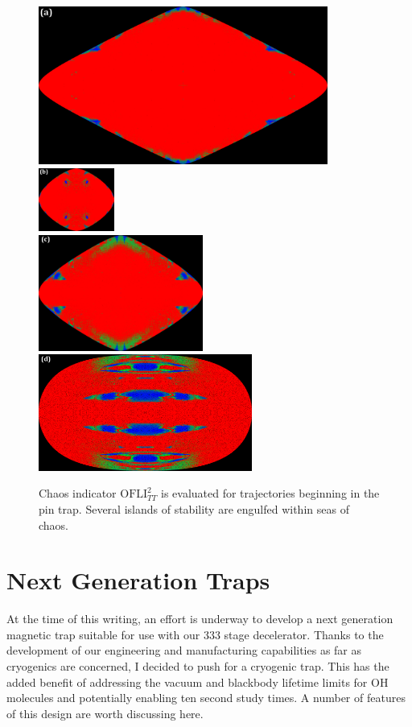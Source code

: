 \documentclass[defaultstyle,11pt]{thesis}
\begin{document}
\begin{figure}
\centering
\includegraphics[width=9.5cm]{pin0p25xy.png}
\includegraphics[width=2.5cm]{pin0p75xy.png}\\
\includegraphics[width=5.4cm]{pin0p5xy.png}
\includegraphics[width=7cm]{pin0p5yz.png}\\
\caption[Chaos Indicators in the Pin Trap]{Chaos indicator $\text{OFLI}_{TT}^2$ is evaluated for trajectories beginning in the pin trap. Several islands of stability are engulfed within seas of chaos.}
\label{pinchaos}
\end{figure}


\section{Next Generation Traps}

At the time of this writing, an effort is underway to develop a next generation magnetic trap suitable for use with our $333$ stage decelerator.
Thanks to the development of our engineering and manufacturing capabilities as far as cryogenics are concerned, I decided to push for a cryogenic trap.
This has the added benefit of addressing the vacuum and blackbody lifetime limits for OH molecules and potentially enabling ten second study times.
A number of features of this design are worth discussing here.
\end{document}
